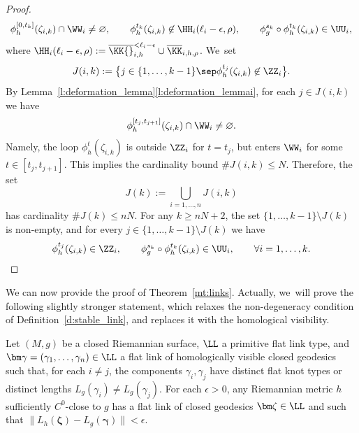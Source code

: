 \begin{proof}
\begin{align*}
\phi_h^{[0,t_k]}(\zeta_{i,k})\cap \WW_i \neq \varnothing,
\qquad
\phi_h^{t_k}(\zeta_{i,k})\not\in\HH_i(\ell_i-\epsilon,\rho),
\qquad
\phi_g^{s_k}\circ\phi_h^{t_k}(\zeta_{i,k})\in\UU_i,
\end{align*}
where $\HH_i(\ell_i-\epsilon,\rho):=\overline\KK{}_{i,h}^{<\ell_i-\epsilon}\cup\overline\KK_{i,h,\rho}$. We~set
\[
J(i,k):=\big\{ j\in\{1,\dots,k-1\}\sep\phi_h^{t_j}(\zeta_{i,k})\not\in\ZZ_i \big\}.
\]
By Lemma~\ref{l:deformation_lemma}\eqref{l:deformation_lemmai}, for each $j\in J(i,k)$ we have
\[
\phi_h^{[t_j,t_{j+1}]}(\zeta_{i,k})\cap\WW_i\neq\varnothing.
\]
Namely, the loop $\phi_h^{t}(\zeta_{i,k})$ is outside $\ZZ_i$ for $t=t_j$, but enters $\WW_i$ for some $t\in[t_j,t_{j+1}]$. This implies the cardinality bound $\# J(i,k) \leq N$.
Therefore, the set
\[
J(k):=\bigcup_{i=1,\dots,n} J(i,k)
\]
has cardinality $\#J(k)\leq nN$. For any $k\geq nN+2$, the set $\{1,\dots,k-1\}\setminus J(k)$ is non-empty, and for every $j\in\{1,\dots,k-1\}\setminus J(k)$ we have
\[
\phi_h^{t_{j}}(\zeta_{i,k})\in\ZZ_i,
\qquad
\phi_g^{s_k}\circ\phi_h^{t_{k}}(\zeta_{i,k})\in\UU_i,
\qquad\forall i=1,\dots,k.
\qedhere
\]
\end{proof}

We can now provide the proof of Theorem~\ref{mt:links}. Actually, we~will prove the following slightly stronger statement, which relaxes the non-degeneracy condition of Definition~\ref{d:stable_link}, and replaces it with the homological visibility.

\begin{Thm}\label{t:links}
Let $(M,g)$ be a closed Riemannian surface, $\LL$ a primitive flat link type, and $\bm\gamma=(\gamma_1,\dots,\gamma_n)\in\LL$ a flat link of homologically visible closed geodesics such that, for each $i\neq j$, the components $\gamma_i,\gamma_j$ have distinct flat knot types or distinct lengths $L_g(\gamma_i)\neq L_g(\gamma_j)$. For each $\epsilon>0$, any Riemannian metric $h$ sufficiently $C^0$-close to $g$ has a flat link of closed geodesics $\bm\zeta\in\LL$ and such that $\| L_h(\bm\zeta)- L_g(\bm\gamma)\|<\epsilon$.
\end{Thm}

